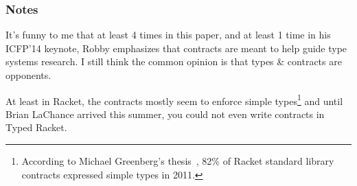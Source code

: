 \documentclass{article}
\begin{document}
\subsubsection*{Notes}

It's funny to me that at least 4 times in this paper, and at least 1 time in his ICFP'14 keynote, Robby emphasizes that contracts are meant to help guide type systems research.
I still think the common opinion is that types \& contracts are opponents.

\qquad At least in Racket, the contracts mostly seem to enforce simple types\footnote{According to Michael Greenberg's thesis~\cite{g-manifest}, 82\% of Racket standard library contracts expressed simple types in 2011.} and until Brian LaChance arrived this summer, you could not even write contracts in Typed Racket.

\footnotesize


\end{document}
